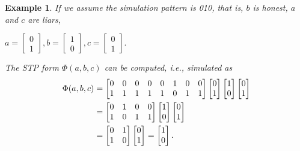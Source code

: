 \documentclass[conference]{IEEEtran}
\newtheorem{ownexample}{Example} 			%
\begin{document}
\begin{ownexample}
If we assume the simulation pattern is 010, that is, $b$ is honest, $a$ and $c$ are liars,
\begin{center}
$a =\begin{bmatrix} 0 \\ 1  \end{bmatrix} , b =\begin{bmatrix} 1 \\ 0  \end{bmatrix} , c =\begin{bmatrix} 0 \\ 1  \end{bmatrix}.$
\end{center}
The STP form $\Phi(a, b, c)$ can be computed, i.e., simulated as 
\begin{align}
  \Phi(a, b, c) & = \begin{bmatrix} 0&0&0&0&0&1&0&0 \\ 1&1&1&1&1&0&1&1  \end{bmatrix} \begin{bmatrix} 0 \\ 1  \end{bmatrix}\begin{bmatrix} 1 \\ 0  \end{bmatrix}\begin{bmatrix} 0 \\ 1  \end{bmatrix} \notag  \\
                & = \begin{bmatrix} 0&1&0&0 \\ 1&0&1&1  \end{bmatrix} \begin{bmatrix} 1 \\ 0  \end{bmatrix}\begin{bmatrix} 0 \\ 1  \end{bmatrix} \notag \\
                & = \begin{bmatrix} 0&1 \\ 1&0  \end{bmatrix} \begin{bmatrix} 0 \\ 1  \end{bmatrix} = \begin{bmatrix} 1 \\ 0  \end{bmatrix}.  \notag
\end{align}
\end{ownexample}
\end{document}
